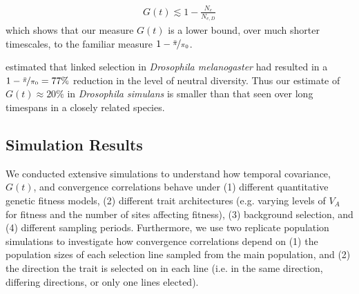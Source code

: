 \documentclass[11pt]{article}
\begin{document}
{\begin{align}
  G(t) \lesssim 1 - \frac{N_e}{N_{e,D}} 
\end{align}
which shows that our measure $G(t)$ is a lower bound, over much shorter
timescales, to the familiar measure $1 -
\nicefrac{\bar{\pi}}{\pi_{0}}$. 

\textcite{Elyashiv2016-vt} estimated that linked selection in \emph{Drosophila
  melanogaster} had resulted in a $1 - \nicefrac{\bar{\pi}}{\pi_{0}} = 77\%$
  reduction in the level of neutral diversity. Thus our estimate of $G(t)
  \approx 20\%$ in \emph{Drosophila simulans} is smaller than that seen over
long timespans in a closely related species. }








\subsection{Simulation Results}
\label{supp:forward}

We conducted extensive simulations to understand how temporal covariance,
$G(t)$, and convergence correlations behave under (1) different quantitative
genetic fitness models, (2) different trait architectures (e.g. varying levels
of $V_A$ for fitness and the number of sites affecting fitness), (3) background
selection, and (4) different sampling periods. Furthermore, we use two
replicate population simulations to investigate how convergence
correlations depend on (1) the population sizes of each selection line sampled
from the main population, and (2) the direction the trait is selected on in
each line (i.e.  in the same direction, differing directions, or only one lines
elected).
\end{document}
